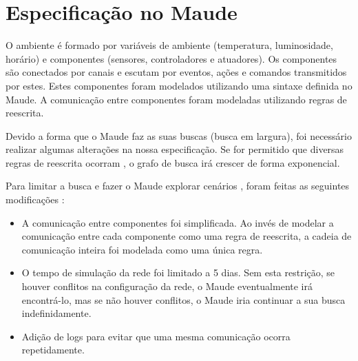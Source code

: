 \section{Especificação no Maude} \label{sec:chap5}

O ambiente é formado por variáveis de ambiente (temperatura, luminosidade, horário) e componentes (sensores, controladores e atuadores). Os componentes são conectados por canais e escutam por eventos, ações e comandos transmitidos por estes. Estes componentes foram modelados utilizando uma sintaxe definida no Maude. A comunicação entre componentes foram modeladas utilizando regras de reescrita.

Devido a forma que o Maude faz as suas buscas (busca em largura), foi necessário realizar algumas alterações na nossa especificação. Se for permitido que diversas regras de reescrita ocorram , o grafo de busca irá crescer de forma exponencial.
 

Para limitar a busca e fazer o Maude explorar cenários , foram feitas as seguintes modificações :

\begin{itemize}
  \item A comunicação entre componentes foi simplificada. Ao invés de modelar a comunicação entre cada componente como uma regra de reescrita, a cadeia de comunicação inteira foi modelada como uma única regra.
  \item O tempo de simulação da rede foi limitado a 5 dias. Sem esta restrição, se houver conflitos na configuração da rede, o Maude eventualmente irá encontrá-lo, mas se não houver conflitos, o Maude iria continuar a sua busca indefinidamente.
  \item Adição de logs para evitar que uma mesma comunicação ocorra repetidamente.
\end{itemize}

